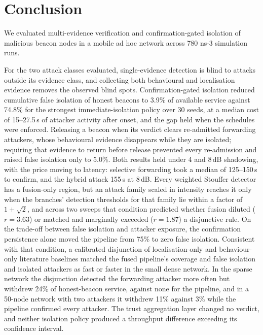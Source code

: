 \section{Conclusion}
\label{sec:conclusion}

We evaluated multi-evidence verification and confirmation-gated isolation of
malicious beacon nodes in a mobile ad hoc network across 780 ns-3 simulation
runs.

For the two attack classes evaluated, single-evidence detection is blind to
attacks outside its evidence class, and collecting both behavioural and
localisation evidence removes the observed blind spots. Confirmation-gated
isolation reduced cumulative false isolation of honest beacons to 3.9\% of
available service against 74.8\% for the strongest immediate-isolation policy
over 30 seeds, at a median cost of 15--27.5\,s of attacker activity after
onset, and the gap held when the schedules were enforced. Releasing a beacon
when its verdict clears re-admitted forwarding attackers, whose behavioural
evidence disappears while they are isolated; requiring that evidence to return
before release prevented every re-admission and raised false isolation only to
5.0\%. Both results held under 4 and 8\,dB shadowing, with the price moving to
latency: selective forwarding took a median of 125--150\,s to confirm, and
the hybrid attack 155\,s at 8\,dB. Every weighted
Stouffer detector has a fusion-only region, but an attack family scaled in
intensity reaches it only when the branches' detection thresholds for that
family lie within a factor of $1+\sqrt2$, and across two sweeps that condition
predicted whether fusion diluted ($r = 3.63$) or matched and marginally
exceeded ($r = 1.87$) a disjunctive rule. On the trade-off between false
isolation and attacker exposure, the confirmation persistence alone moved
the pipeline from 75\% to zero false isolation. Consistent with that condition, a
calibrated disjunction of localisation-only and behaviour-only literature
baselines matched the fused pipeline's coverage and false isolation and
isolated attackers as fast or faster in the small dense network. In the
sparse network the disjunction detected the forwarding attacker more often
but withdrew 24\% of honest-beacon service, against none for the pipeline,
and in a 50-node network with two attackers it withdrew 11\% against 3\%
while the pipeline confirmed every attacker. The trust aggregation layer changed
no verdict, and neither isolation policy produced a throughput difference
exceeding its confidence interval.

